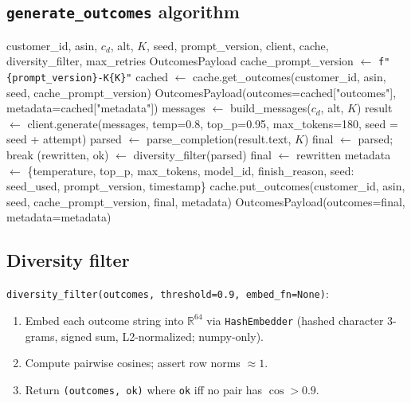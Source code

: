 \documentclass[11pt,a4paper]{article}
\begin{document}
\subsection{\texttt{generate\_outcomes} algorithm}

\begin{algorithm}[H]
\caption{End-to-end outcome generation with cache and retries}
\begin{algorithmic}[1]
\Require customer\_id, asin, $c_d$, alt, $K$, seed, prompt\_version, client, cache, diversity\_filter, max\_retries
\Ensure OutcomesPayload
\State cache\_prompt\_version $\gets$ \texttt{f"\{prompt\_version\}-K\{K\}"}
  \State cached $\gets$ cache.get\_outcomes(customer\_id, asin, seed, cache\_prompt\_version)
    \State \Return OutcomesPayload(outcomes=cached["outcomes"], metadata=cached["metadata"])
  \EndIf
\EndIf
\State messages $\gets$ build\_messages($c_d$, alt, $K$) 
  \State result $\gets$ client.generate(messages, temp=0.8, top\_p=0.95, max\_tokens=180, seed = seed + attempt)
  \State parsed $\gets$ parse\_completion(result.text, $K$) 
    \State final $\gets$ parsed; break
  \EndIf
  \State (rewritten, ok) $\gets$ diversity\_filter(parsed)
  \State final $\gets$ rewritten
  \EndIf
\EndFor
\State metadata $\gets$ \{temperature, top\_p, max\_tokens, model\_id, finish\_reason, seed: seed\_used, prompt\_version, timestamp\}
  \State cache.put\_outcomes(customer\_id, asin, seed, cache\_prompt\_version, final, metadata)
\EndIf
\State \Return OutcomesPayload(outcomes=final, metadata=metadata)
\end{algorithmic}
\end{algorithm}

\subsection{Diversity filter}

\texttt{diversity\_filter(outcomes, threshold=0.9, embed\_fn=None)}:

\begin{enumerate}
\item Embed each outcome string into $\mathbb{R}^{64}$ via
\texttt{HashEmbedder} (hashed character 3-grams, signed sum,
L2-normalized; numpy-only).
\item Compute pairwise cosines; assert row norms $\approx 1$.
\item Return \texttt{(outcomes, ok)} where \texttt{ok} iff no pair has $\cos > 0.9$.
\end{enumerate}
\end{document}
